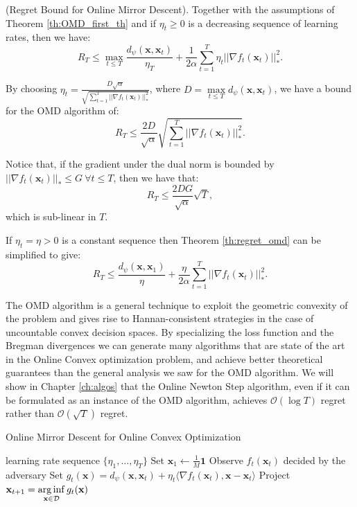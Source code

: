 \begin{theorem}(Regret Bound for Online Mirror Descent).\label{th:regret_omd} Together with the assumptions of Theorem \ref{th:OMD_first_th} and if $\eta_t\ge0$ is a decreasing sequence of learning rates, then we have: 
$$R_T\le\max\limits_{t\le T}\frac{d_\psi(\mathbf x,\mathbf x_t)}{\eta_T}+\frac{1}{2\alpha}\sum\limits_{t=1}^T\eta_t||\nabla f_t(\mathbf x_t)||_*^2.$$
\end{theorem}


By choosing $\eta_t=\frac{D\sqrt{\alpha}}{\sqrt{\sum\limits_{t=1}^T||\nabla f_t(\mathbf x_t)||_*^2}}$, where $D=\max\limits_{t\le T}d_\psi(\mathbf x,\mathbf x_t)$, we have a bound for the OMD algorithm of:
\begin{equation}
R_T\le\frac{2D}{\sqrt\alpha}\sqrt{\sum\limits_{t=1}^T||\nabla f_t(\mathbf x_t)||_*^2}.
\end{equation}

Notice that, if the gradient under the dual norm is bounded by $||\nabla f_t(\mathbf x_t)||_*\le G\ \forall t\le T$, then we have that: 
\begin{equation}
R_T\le\frac{2DG}{\sqrt\alpha}\sqrt T,
\end{equation}
which is sub-linear in $T$.

If $\eta_t=\eta>0$ is a constant sequence then Theorem \ref{th:regret_omd} can be simplified to give: 
\begin{equation}
R_T\le \frac{d_\psi(\mathbf x,\mathbf x_1)}{\eta}+\frac{\eta}{2\alpha}\sum\limits_{t=1}^T||\nabla f_t(\mathbf x_t)||^2_*.
\end{equation}

The OMD algorithm is a general technique to exploit the geometric convexity of the problem and gives rise to Hannan-consistent strategies in the case of uncountable convex decision spaces. By specializing the loss function and the Bregman divergences we can generate many algorithms that are state of the art in the Online Convex optimization problem, and achieve better theoretical guarantees than the general analysis we saw for the OMD algorithm. We will show in Chapter \ref{ch:algos} that the Online Newton Step algorithm, even if it can be formulated as an instance of the OMD algorithm, achieves $\mathcal O(\log T)$ regret rather than $\mathcal O(\sqrt T)$ regret.

\begin{algorithm}[t!]
    \caption{Online Mirror Descent for Online Convex Optimization} 
    \label{alg:OMD_in_OCO}
    \begin{algorithmic}[1]
    \REQUIRE learning rate sequence $\{\eta_1, \ldots, \eta_T\}$  \nonumber
    \STATE Set $\mathbf{\mathbf x}_1 \gets \frac{1}{M} \mathbf{1}$ \label{line:init}
    \STATE Observe $f_t(\mathbf x_t)$ decided by the adversary \label{line:out}
    \STATE Set $ g_{t}(\mathbf x)=d_\psi(\mathbf x,\mathbf x_t)+\eta_t\langle\nabla f_t(\mathbf x_t),\mathbf x-\mathbf x_t\rangle$
    \STATE Project $\mathbf x_{t+1} =\operatorname*{arg\,inf}\limits_{\mathbf x\in\mathcal D}g_{t}(\mathbf x)$\label{line:update}
    \ENDFOR
    \end{algorithmic}
\end{algorithm}

